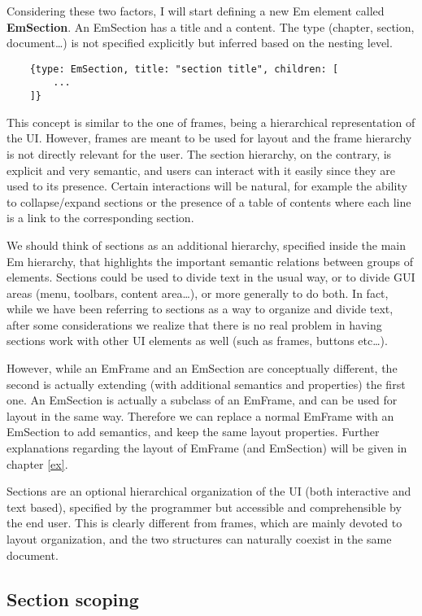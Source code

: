 Considering these two factors, I will start defining a new Em element called \textbf{EmSection}. An EmSection has a title and a content. The type (chapter, section, document\ldots) is not specified explicitly but inferred based on the nesting level.

\begin{verbatim}
    {type: EmSection, title: "section title", children: [
        ...
    ]}
\end{verbatim}

This concept is similar to the one of frames, being a hierarchical representation of the UI. However, frames are meant to be used for layout and the frame hierarchy is not directly relevant for the user. The section hierarchy, on the contrary, is explicit and very semantic, and users can interact with it easily since they are used to its presence. Certain interactions will be natural, for example the ability to collapse/expand sections or the presence of a table of contents where each line is a link to the corresponding section.

We should think of sections as an additional hierarchy, specified inside the main Em hierarchy, that highlights the important semantic relations between groups of elements. Sections could be used to divide text in the usual way, or to divide GUI areas (menu, toolbars, content area\ldots), or more generally to do both. In fact, while we have been referring to sections as a way to organize and divide text, after some considerations we realize that there is no real problem in having sections work with other UI elements as well (such as frames, buttons etc\ldots).

However, while an EmFrame and an EmSection are conceptually different, the second is actually extending (with additional semantics and properties) the first one. An EmSection is actually a subclass of an EmFrame, and can be used for layout in the same way. Therefore we can replace a normal EmFrame with an EmSection to add semantics, and keep the same layout properties. Further explanations regarding the layout of EmFrame (and EmSection) will be given in chapter \ref{ex}.

Sections are an optional hierarchical organization of the UI (both interactive and text based), specified by the programmer but accessible and comprehensible by the end user. This is clearly different from frames, which are mainly devoted to layout organization, and the two structures can naturally coexist in the same document.

\subsection{Section scoping}

